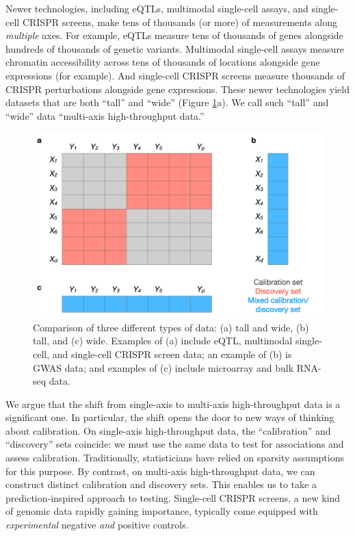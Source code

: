 \documentclass[12pt]{article}
\begin{document}
Newer technologies, including eQTLs, multimodal single-cell assays, and single-cell CRISPR screens, make tens of thousands (or more) of measurements along \textit{multiple} axes. For example, eQTLs measure tens of thousands of genes alongside hundreds of thousands of genetic variants. Multimodal single-cell assays measure chromatin accessibility across tens of thousands of locations alongside gene expressions (for example). And single-cell CRISPR screens measure thousands of CRISPR perturbations alongside gene expressions. These newer technologies yield datasets that are both ``tall'' and ``wide'' (Figure \ref{fig:calibration_sets}a). We call such ``tall'' and ``wide'' data ``multi-axis high-throughput data.''

\begin{figure}[h!]
	\centering
	\includegraphics[width=1\linewidth]{calibration_sets}
	\caption{Comparison of three different types of data: (a) tall and wide, (b) tall, and (c) wide. Examples of (a) include eQTL, multimodal single-cell, and single-cell CRISPR screen data; an example of (b) is GWAS data; and examples of (c) include microarray and bulk RNA-seq data.}
	\label{fig:calibration_sets}
\end{figure}	

We argue that the shift from single-axis to multi-axis high-throughput data is a significant one. In particular, the shift opens the door to new ways of thinking about calibration. On single-axis high-throughput data, the ``calibration'' and ``discovery'' sets coincide: we must use the same data to test for associations and assess calibration. Traditionally, statisticians have relied on sparsity assumptions for this purpose. By contrast, on multi-axis high-throughput data, we can construct distinct calibration and discovery sets. This enables us to take a prediction-inspired approach to testing. Single-cell CRISPR screens, a new kind of genomic data rapidly gaining importance, typically come equipped with \textit{experimental} negative \textit{and} positive controls.
\end{document}
